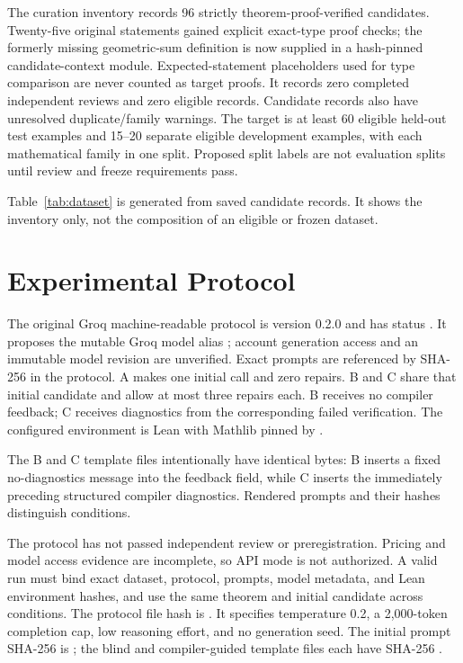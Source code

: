 \documentclass[runningheads,a4paper]{llncs}
\begin{document}
The curation inventory records 96 strictly theorem-proof-verified candidates. Twenty-five original
statements gained explicit exact-type proof checks; the formerly missing
geometric-sum definition is now supplied in a hash-pinned candidate-context
module. Expected-statement placeholders used for type comparison are never
counted as target proofs. It records zero completed independent
reviews and zero eligible records. Candidate records
also have unresolved duplicate/family warnings. The target is at least 60
eligible held-out test examples and 15--20 separate eligible development
examples, with each mathematical family in one split. Proposed split labels
are not evaluation splits until review and freeze requirements pass.

Table~\ref{tab:dataset} is generated from saved candidate records. It shows
the inventory only, not the composition of an eligible or frozen dataset.
\begin{table}
\caption{Current candidate inventory by category, difficulty, provenance,
and proposed split. Counts are candidates, not eligible examples.}
\label{tab:dataset}\centering
\resizebox{\linewidth}{!}{}
\end{table}

\section{Experimental Protocol}
The original Groq machine-readable protocol is version 0.2.0 and has status
. It proposes the
mutable Groq model alias ; account generation
access and an immutable model revision are unverified. Exact prompts are
referenced by SHA-256 in the protocol. A makes one initial call and zero
repairs. B and C share that initial candidate and allow at most three repairs
each. B receives no compiler feedback; C receives diagnostics from the
corresponding failed verification. The configured environment is Lean
 with Mathlib pinned by
.

The B and C template files intentionally have identical bytes: B inserts a fixed no-diagnostics message into the feedback field, while C inserts the immediately preceding structured compiler diagnostics. Rendered prompts and their hashes distinguish conditions.

The protocol has not passed independent review or preregistration. Pricing and
model access evidence are incomplete, so API mode is not authorized. A valid
run must bind exact dataset, protocol, prompts, model metadata, and Lean
environment hashes, and use the same theorem and initial candidate across
conditions. The protocol file hash is
.
It specifies temperature 0.2, a 2,000-token completion cap, low reasoning
effort, and no generation seed. The initial prompt SHA-256 is
;
the blind and compiler-guided template files each have SHA-256
.
\end{document}
